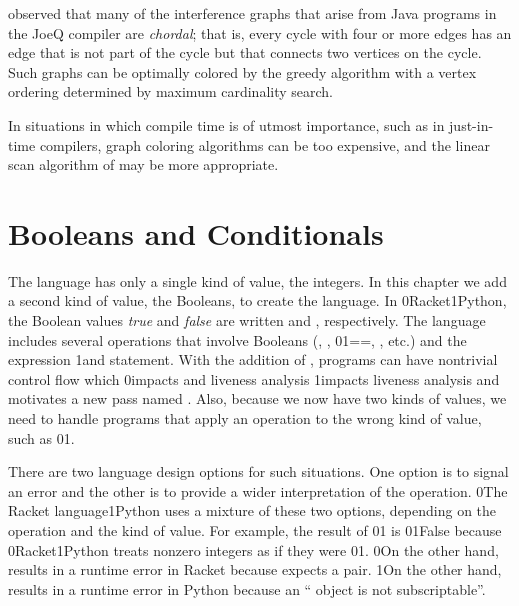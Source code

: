 \documentclass[7x10]{TimesAPriori_MIT}%
\def\racketEd{0}
\def\pythonEd{1}
\def\edition{0}
\newcommand{\racket}[1]{{\if\edition\racketEd{#1}\fi}}
\newcommand{\python}[1]{{\if\edition\pythonEd #1\fi}}
\numberwithin{theorem}{chapter}
\numberwithin{definition}{chapter}
\numberwithin{equation}{chapter}
\begin{document}


\citet{Palsberg:2007si} observed that many of the interference graphs
that arise from Java programs in the JoeQ compiler are \emph{chordal};
that is, every cycle with four or more edges has an edge that is not
part of the cycle but that connects two vertices on the cycle. Such
graphs can be optimally colored by the greedy algorithm with a vertex
ordering determined by maximum cardinality search.

In situations in which compile time is of utmost importance, such as
in just-in-time compilers, graph coloring algorithms can be too
expensive, and the linear scan algorithm of \citet{Poletto:1999uq} may
be more appropriate.


\chapter{Booleans and Conditionals}
\label{ch:Lif}
\setcounter{footnote}{0}

The \LangVar{} language has only a single kind of value, the
integers. In this chapter we add a second kind of value, the Booleans,
to create the \LangIf{} language. In \racket{Racket}\python{Python},
the Boolean values \emph{true} and \emph{false} are written \TRUE{}
and \FALSE{}, respectively.  The \LangIf{} language includes several
operations that involve Booleans (, ,
\racket{}\python{==}, \key{<}, etc.) and the 
expression \python{and statement}.  With the addition of ,
programs can have nontrivial control flow which
%
\racket{impacts  and liveness analysis}
%
\python{impacts liveness analysis and motivates a new pass named
  \code{explicate\_control}}.
%
Also, because we now have two kinds of values, we need to handle
programs that apply an operation to the wrong kind of value, such as
\racket{}\python{}.

There are two language design options for such situations.  One option
is to signal an error and the other is to provide a wider
interpretation of the operation. \racket{The Racket
  language}\python{Python} uses a mixture of these two options,
depending on the operation and the kind of value. For example, the
result of \racket{}\python{} is
\racket{}\python{False} because \racket{Racket}\python{Python}
treats nonzero integers as if they were \racket{}\python{}.
%
\racket{On the other hand,  results in a runtime error
  in Racket because \code{car} expects a pair.}
%
\python{On the other hand,  results in a runtime error
  in Python because an ``\code{int} object is not subscriptable''.}
\end{document}

